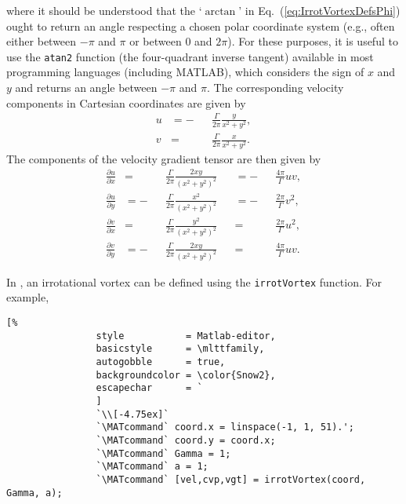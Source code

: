 \documentclass[10pt, twoside]{book}
\begin{document}
			where it should be understood that the `$\arctan$' in Eq.~(\ref{eq:IrrotVortexDefsPhi}) ought to return an angle respecting a chosen polar coordinate system (e.g., often either between $-\pi$ and $\pi$ or between $0$ and $2\pi$). For these purposes, it is useful to use the \texttt{atan2} function (the four-quadrant inverse tangent) available in most programming languages (including MATLAB), which considers the sign of $x$ and $y$ and returns an angle between $-\pi$ and $\pi$. The corresponding velocity components in Cartesian coordinates are given by
			\begin{subequations}
				\label{eq:IrrotVortexVel}
				\begin{alignat}{2}
					u &= -&&\frac{\Gamma}{2\pi}\frac{y}{x^2 + y^2},\label{eq:IrrotVortexVelPolarU}\\
					v &=  &&\frac{\Gamma}{2\pi}\frac{x}{x^2 + y^2}.\label{eq:IrrotVortexVelPolarV}
				\end{alignat}
			\end{subequations}
			The components of the velocity gradient tensor are then given by
			\begin{subequations}
			\label{eq:IrrotVortexVgt}
				\begin{alignat}{4}
					\frac{\partial u}{\partial x} &= &&\frac{\Gamma}{2\pi}\frac{2xy}{\left(x^2 + y^2\right)^2} &&= -&&\frac{4\pi}{\Gamma}uv,\label{eq:IrrotVortexVgtUx}\\
					\frac{\partial u}{\partial y} &= -&&\frac{\Gamma}{2\pi}\frac{x^2}{\left(x^2 + y^2\right)^2} &&= -&&\frac{2\pi}{\Gamma}v^2,\label{eq:IrrotVortexVgtUy}\\
					\frac{\partial v}{\partial x} &= &&\frac{\Gamma}{2\pi}\frac{y^2}{\left(x^2 + y^2\right)^2} &&= &&\frac{2\pi}{\Gamma}u^2,\label{eq:IrrotVortexVgtVx}\\
					\frac{\partial v}{\partial y} &= -&&\frac{\Gamma}{2\pi}\frac{2xy}{\left(x^2 + y^2\right)^2} &&= &&\frac{4\pi}{\Gamma}uv.\label{eq:IrrotVortexVgtVy}
				\end{alignat}
			\end{subequations}
			
			
			In \MATfluids, an irrotational vortex can be defined using the \texttt{irrotVortex} function. For example,
			\begin{lstlisting}[%
				style           = Matlab-editor,
				basicstyle      = \mlttfamily,
				autogobble      = true,
				backgroundcolor = \color{Snow2},
				escapechar      = `
				]
				`\\[-4.75ex]`
				`\MATcommand` coord.x = linspace(-1, 1, 51).';
				`\MATcommand` coord.y = coord.x;
				`\MATcommand` Gamma = 1;
				`\MATcommand` a = 1;
				`\MATcommand` [vel,cvp,vgt] = irrotVortex(coord, Gamma, a);
			\end{lstlisting}
			
\end{document}
